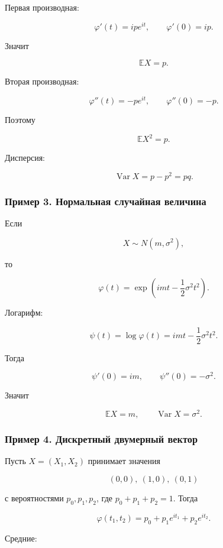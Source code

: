\documentclass[
  11pt,
  a4paper,
]{article}
\begin{document}
Первая производная:

\[
\varphi'(t)=ipe^{it},
\qquad
\varphi'(0)=ip.
\]

Значит

\[
\mathbb EX=p.
\]

Вторая производная:

\[
\varphi''(t)=-pe^{it},
\qquad
\varphi''(0)=-p.
\]

Поэтому

\[
\mathbb EX^2=p.
\]

Дисперсия:

\[
\operatorname{Var}X=p-p^2=pq.
\]

\subsubsection{Пример 3. Нормальная случайная
величина}\label{ux43fux440ux438ux43cux435ux440-3.-ux43dux43eux440ux43cux430ux43bux44cux43dux430ux44f-ux441ux43bux443ux447ux430ux439ux43dux430ux44f-ux432ux435ux43bux438ux447ux438ux43dux430}

Если

\[
X\sim N(m,\sigma^2),
\]

то

\[
\varphi(t)=\exp\left(imt-\frac12\sigma^2t^2\right).
\]

Логарифм:

\[
\psi(t)=\log\varphi(t)=imt-\frac12\sigma^2t^2.
\]

Тогда

\[
\psi'(0)=im,
\qquad
\psi''(0)=-\sigma^2.
\]

Значит

\[
\mathbb EX=m,
\qquad
\operatorname{Var}X=\sigma^2.
\]

\subsubsection{Пример 4. Дискретный двумерный
вектор}\label{ux43fux440ux438ux43cux435ux440-4.-ux434ux438ux441ux43aux440ux435ux442ux43dux44bux439-ux434ux432ux443ux43cux435ux440ux43dux44bux439-ux432ux435ux43aux442ux43eux440}

Пусть \(X=(X_1,X_2)\) принимает значения

\[
(0,0),\ (1,0),\ (0,1)
\]

с вероятностями \(p_0,p_1,p_2\), где \(p_0+p_1+p_2=1\). Тогда

\[
\varphi(t_1,t_2)
=
p_0+p_1e^{it_1}+p_2e^{it_2}.
\]

Средние:
\end{document}
